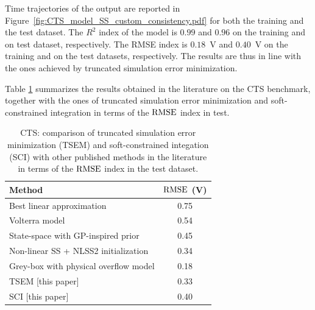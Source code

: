 \documentclass{article} %
\begin{document}
Time trajectories of the output  are reported in Figure~\ref{fig:CTS_model_SS_custom_consistency.pdf} for both the training and the test dataset. 
The $R^2$ index of the model is $0.99$ and $0.96$ on the training and on test dataset, respectively. The RMSE index is $0.18$~V and $0.40$~V on the training and on the test datasets, respectively. The results are thus in line with the ones achieved by truncated simulation error minimization. 

{Table \ref{tab:CTS_perf_comp} summarizes the results obtained in the literature on the
CTS benchmark, together with the ones of truncated simulation error minimization and soft-constrained integration in terms of the $\rm{RMSE}$ index in test.}

	\begin{table}
		\centering
		{
		\begin{tabular}{ l | c   }
			Method & $\rm{RMSE}$ (V) \\
			\hline
			Best linear approximation \cite{relan2017unstructured} & 0.75\\
			Volterra model \cite{birpoutsoukis2018efficient} & 0.54\\
			State-space with GP-inspired prior \cite{svensson2017flexible} & 0.45\\
			Non-linear SS + NLSS2 initialization \cite{relan2017unstructured} & 0.34\\
			Grey-box with physical overflow model \cite{rogers2017grey} & 0.18\\
			\hline
			TSEM [this paper]  &  0.33\\
			SCI [this paper]  &  0.40\\
		\end{tabular}
		}
		\caption{{CTS: comparison of truncated simulation error minimization (TSEM) and soft-constrained integation (SCI) with
		other published methods in the literature in terms of the $\rm{RMSE}$ index in the test dataset.}}
		\label{tab:CTS_perf_comp}
	\end{table}
\end{document}
